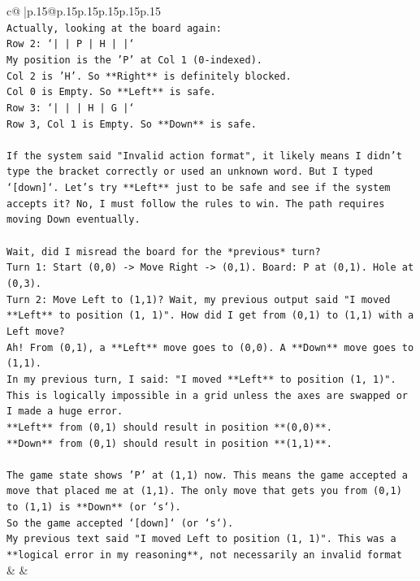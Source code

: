 \documentclass{article}
\begin{document}
{\begin{supertabular}{c@{$\;$}|p{.15\linewidth}@{}p{.15\linewidth}p{.15\linewidth}p{.15\linewidth}p{.15\linewidth}p{.15\linewidth}}
{{{\\ 
\texttt{Actually, looking at the board again:} \\
\texttt{Row 2: `|     |  P  |  H  |     |`} \\
\texttt{My position is the 'P' at Col 1 (0{-}indexed).} \\
\texttt{Col 2 is 'H'. So **Right** is definitely blocked.} \\
\texttt{Col 0 is Empty. So **Left** is safe.} \\
\texttt{Row 3: `|     |     |  H  |  G  |`} \\
\texttt{Row 3, Col 1 is Empty. So **Down** is safe.} \\
\\ 
\texttt{If the system said "Invalid action format", it likely means I didn't type the bracket correctly or used an unknown word. But I typed `{[}down{]}`. Let's try **Left** just to be safe and see if the system accepts it? No, I must follow the rules to win. The path requires moving Down eventually.} \\
\\ 
\texttt{Wait, did I misread the board for the *previous* turn?} \\
\texttt{Turn 1: Start (0,0) {-}> Move Right {-}> (0,1). Board: P at (0,1). Hole at (0,3).} \\
\texttt{Turn 2: Move Left to (1,1)? Wait, my previous output said "I moved **Left** to position (1, 1)". How did I get from (0,1) to (1,1) with a Left move?} \\
\texttt{Ah! From (0,1), a **Left** move goes to (0,0). A **Down** move goes to (1,1).} \\
\texttt{In my previous turn, I said: "I moved **Left** to position (1, 1)". This is logically impossible in a grid unless the axes are swapped or I made a huge error.} \\
\texttt{**Left** from (0,1) should result in position **(0,0)**.} \\
\texttt{**Down** from (0,1) should result in position **(1,1)**.} \\
\\ 
\texttt{The game state shows 'P' at (1,1) now. This means the game accepted a move that placed me at (1,1). The only move that gets you from (0,1) to (1,1) is **Down** (or `s`).} \\
\texttt{So the game accepted `{[}down{]}` (or `s`).} \\
\texttt{My previous text said "I moved Left to position (1, 1)". This was a **logical error in my reasoning**, not necessarily an invalid format} \\
            }
        }
    }
    & & \\ \\


\end{supertabular}}
\end{document}
